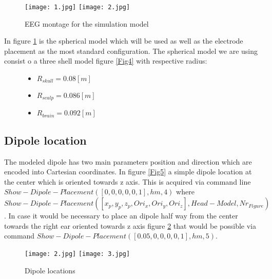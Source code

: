 \begin{figure}[!htbp]
%
    \centering
    \texttt{[image: 1.jpg]}
\endminipage\hfill
{}%
    \centering
    \texttt{[image: 2.jpg]}
\endminipage\hfill
\caption{EEG montage for the simulation model}\label{Fig3}
\end{figure}


In figure \ref{Fig3} is the spherical model which will be used as well as the electrode placement as the most standard configuration. The spherical model we are using consist o a three shell model figure \ref{Fig4} with respective radius:

\begin{figure}[!htbp]
%
    \centering
\begin{itemize}
    \item $R_{skull}=0.08[m]$
\end{itemize}
\endminipage\hfill
{}%
    \centering
\begin{itemize}
    \item $R_{scalp}=0.086[m]$
\end{itemize}
\endminipage\hfill
{}%
    \centering
\begin{itemize}
    \item $R_{brain}=0.092[m]$
\end{itemize}
\endminipage\hfill
\end{figure}


\subsection{Dipole location}

The modeled dipole has two main parameters position and direction which are encoded into Cartesian coordinates. In figure \ref{Fig5} a simple dipole location at the center which is oriented towards z axis. This is acquired via command line $Show-Dipole-Placement([0,0,0,0,0,1],hm,4)$ where $Show-Dipole-Placement([x_{p},y_{p},z_{p},Ori_{x},Ori_{y},Ori_{z}],Head-Model,Nr_{Figure})$. In case it would be necessary to place an dipole half way from the center towards the right ear oriented towards z axis figure \ref{Fig6} that would be possible via command $Show-Dipole-Placement([0.05,0,0,0,0,1],hm,5)$.

\begin{figure}[!htbp]
%
    \centering
\texttt{[image: 2.jpg]}
\label{Fig5}
\endminipage\hfill
{}%
    \centering
\texttt{[image: 3.jpg]}
\label{Fig6}
\endminipage\hfill
\caption{Dipole locations}
\end{figure}



